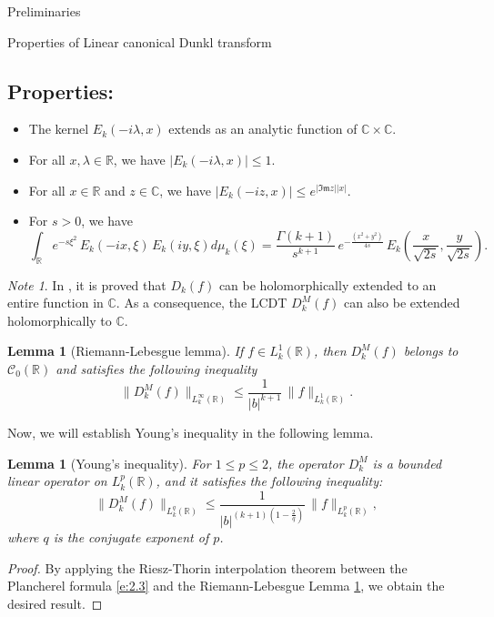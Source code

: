 \documentclass[12pt,a4paper,reqno]{amsproc}
\newtheorem{lemma}[theorem]{Lemma}
\theoremstyle{definition}
\theoremstyle{remark}
\newtheorem{note}[theorem]{Note}
\numberwithin{equation}{section}
\begin{document}
\begin{section}{Preliminaries}
\begin{subsection}{ Properties of Linear 
canonical Dunkl transform}
\subsection{Properties:}\label{pr:2.2}
\begin{itemize}
\item[$(i)$] The kernel $E_k(-i\lambda, x)$ extends as an analytic function of $\mathbb{C}\times \mathbb{C}.$ 
\item[$(ii$)] For all $x, \lambda \in \mathbb{R}$, we have $|E_k(-i\lambda,x)|\le 1$.
\item[$(iii)$] For all $x\in \mathbb{R}$ and $z\in \mathbb{C}$, we have $\left|E_k\left(-iz,x\right)\right| \le e^{|\mathfrak{Im}z||x|}$.
\item[$(iv)$] For $s>0$, we have $$\int_\mathbb{R} e^{-s\xi^2}\, E_k(-ix, \xi)\, E_k(iy, \xi) d\mu_k(\xi) = \frac{\Gamma(k+1)}{s^{k+1}}\,e^{-\frac{(x^2+y^2)}{4s}}\,E_k\left( \frac{x}{\sqrt{2s}}, \frac{y}{\sqrt{2s}}\right).$$
\end{itemize}
\begin{note} \label{N:2.4}
   In \cite{kawazoe2010uncertainty}, it is proved that $D_k(f)$ can be holomorphically extended to an entire function in $\mathbb{C}$. As a consequence, the LCDT $D_k^M(f)$ can also be extended holomorphically to $\mathbb{C}$.    
\end{note}
\begin{lemma}[Riemann-Lebesgue lemma] \label{le:3.1} If $f\in L_k^1(\mathbb{R})$, then  $D_k^M(f)$ belongs to $\mathcal{C}_0(\mathbb{R})$ and satisfies the following inequality 
\begin{equation*} \label{e:2.4}
    \|D_k^M(f)\|_{L_k^\infty(\mathbb{R})} \le \frac{1}{|b|^{k+1}}\, \|f\|_{L_k^1(\mathbb{R})}.
\end{equation*}
\end{lemma}
Now, we will establish Young's inequality in the following lemma.
\begin{lemma}[Young's inequality] \label{le:3.2} For $ 1 \le p \le 2$, the operator $D_k^M$ is a bounded linear operator on $L_k^p(\mathbb{R})$, and it satisfies the following inequality:   \begin{equation}\label{eq:3.1}
    \|D_k^M(f)\|_{L_k^{q}(\mathbb{R})} \le \frac{1}{|b|^{(k+1)\left(1-\frac{2}{q}\right)}}\, \|f\|_{L^p_k(\mathbb{R})},
\end{equation}
where $q$ is the conjugate exponent of $p$.
\end{lemma} 
\begin{proof}
By applying the Riesz-Thorin interpolation theorem \cite{stein1956interpolation} between the Plancherel formula \eqref{e:2.3} and the Riemann-Lebesgue Lemma \ref{le:3.1}, we obtain the desired result.
\end{proof}
\end{subsection}
\end{section}
\end{document}
